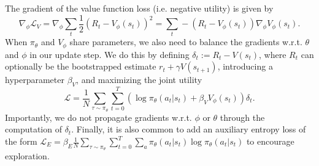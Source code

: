 The gradient of the value function loss (i.e. negative utility) is given by
\begin{equation}
    \nabla_\phi \mathcal{L}_V = \nabla_\phi \sum_t \frac12  (R_t - V_\phi(s_t))^2 = \sum_t - (R_t - V_\phi(s_t)) \nabla_\phi V_\phi(s_t).
\end{equation}
When $\pi_\theta$ and $V_\phi$ share parameters, we also need to balance the gradients w.r.t. $\theta$ and $\phi$ in our update step.
We do this by defining $\delta_t := R_t - V(s_t)$, where $R_t$ can optionally be the bootstrapped estimate $r_t + \gamma V(s_{t+1})$, introducing a hyperparameter $\beta_V$, and maximizing the joint utility
\begin{equation}
    \mathcal{L} = \frac{1}{N} \sum_{\tau \sim \pi_\theta} \sum_{t=0}^T ( \log \pi_\theta (a_t|s_t) + \beta_V V_\phi(s_t) ) \delta_t .
\end{equation}
Importantly, we do not propagate gradients w.r.t. $\phi$ or $\theta$ through the computation of $\delta_t$.
Finally, it is also common to add an auxiliary entropy loss of the form $\mathcal{L}_E = \beta_E \frac{1}{N} \sum_{\tau \sim \pi_\theta} \sum_{t=0}^T \sum_a \pi_\theta (a_t|s_t) \log \pi_\theta (a_t|s_t)$ to encourage exploration.


